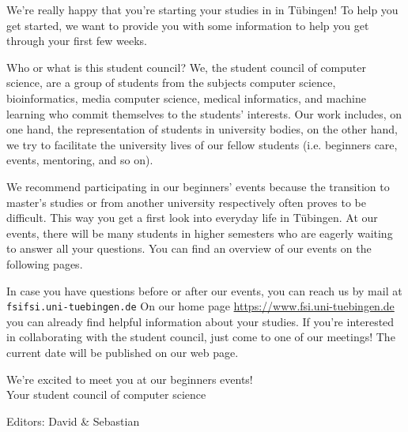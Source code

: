 \thispagestyle{firststyle}
We're really happy that you're starting your studies in \studiengang in Tübingen!
To help you get started, we want to provide you with some information to help you get through your first few weeks.

Who or what is this \glqq student council\grqq? We, the student council of computer science, are a group of students from the subjects computer science, bioinformatics, media computer science, medical informatics, and machine learning
who commit themselves to the students' interests. Our work includes, on one hand, the representation of students in university bodies, on the other hand, we try to facilitate the university lives of our fellow students (i.e. beginners care,
events, mentoring, and so on).

\ifmaster
    \ifml
We recommend participating in our beginners' events because the transition to master's studies or from another university respectively often proves to be difficult. This way you get a first look into everyday life in Tübingen.
    \fi
\fi
At our events, there will be many students in higher semesters who are eagerly waiting to answer all your questions. You can find an overview of our events on the following pages.

In case you have questions before or after our events, you can reach us by mail at \texttt{fsi\At fsi.uni-tuebingen.de}
On our home page
\url{https://www.fsi.uni-tuebingen.de} you can already find helpful information about your studies. If you're interested in collaborating with the student council, just come to one of our meetings! The current date will be published on our web page.

We're excited to meet you at our beginners events!\\
Your student council of computer science
\enlargethispage{3\baselineskip} %
\par\hfill{\footnotesize Editors: David \& Sebastian}
\vfill

